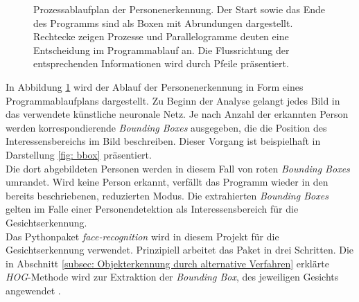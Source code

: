 \begin{figure}[H]
			\caption{Prozessablaufplan der Personenerkennung. Der Start sowie das Ende des Programms sind als Boxen mit Abrundungen dargestellt. Rechtecke zeigen Prozesse und Parallelogramme deuten eine Entscheidung im Programmablauf an. Die Flussrichtung der entsprechenden Informationen wird durch Pfeile präsentiert.}
			\label{fig: Personenerkennung}
		\end{figure}
		\newpage
	
		In Abbildung \ref{fig: Personenerkennung} wird der Ablauf der Personenerkennung in Form eines Programmablaufplans dargestellt. Zu Beginn der Analyse gelangt jedes Bild in das verwendete künstliche neuronale Netz. Je nach Anzahl der erkannten Person werden korrespondierende \textit{Bounding Boxes} ausgegeben, die die Position des Interessensbereichs im Bild beschreiben. Dieser Vorgang ist beispielhaft in Darstellung \ref{fig: bbox} präsentiert.\\
	
		Die dort abgebildeten Personen werden in diesem Fall von roten \textit{Bounding Boxes} umrandet. Wird keine Person erkannt, verfällt das Programm wieder in den bereits beschriebenen, reduzierten Modus. Die extrahierten \textit{Bounding Boxes} gelten im Falle einer Personendetektion als Interessensbereich für die Gesichtserkennung.\\
		
	Das Pythonpaket \textit{face-recognition} wird in diesem Projekt für die Gesichtserkennung verwendet. Prinzipiell arbeitet das Paket in drei Schritten. Die in Abschnitt \ref{subsec: Objekterkennung durch alternative Verfahren} erklärte \textit{HOG}-Methode wird zur Extraktion der \textit{Bounding Box}, des jeweiligen Gesichts angewendet \cite{facerecarticle}.\\
	
